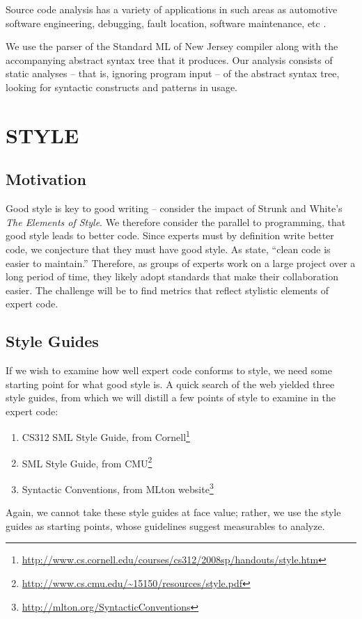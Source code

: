 \documentclass[12pt,abstracton]{scrartcl}
\begin{document}
Source code analysis has a variety of applications in such areas as
automotive software engineering, debugging, fault location, software maintenance,
etc \cite{Bin07}.

We use the parser of the Standard ML of New Jersey compiler along with the accompanying
abstract syntax tree that it produces. Our analysis
consists of static analyses -- that is, ignoring program input -- of the abstract syntax tree, looking for
syntactic constructs and patterns in usage.
\section{STYLE}\label{sec:style}
\subsection{Motivation}\label{subsec:style}
Good style is key to good writing -- consider the impact
of Strunk and White's \emph{The Elements of Style}.
We therefore consider the parallel to programming, that
good style leads to better code. Since experts must by
definition write better code, we conjecture that they
must have good style.
As \cite{Ker78} state, ``clean code is easier to maintain.''
Therefore, as groups of experts work on a large project over
a long period of time, they likely adopt standards that
make their collaboration easier.
The challenge will be to find metrics that reflect stylistic elements of expert code.
\subsection{Style Guides}\label{subsec:guide}
If we wish to examine how well expert code conforms to style, we need some starting point for
what good style is. A quick search of the web yielded three style guides, from which
we will distill a few points of style to examine in the expert code:
\begin{enumerate}
\item CS312 SML Style Guide, from Cornell\footnote{\url{http://www.cs.cornell.edu/courses/cs312/2008sp/handouts/style.htm}}
\item SML Style Guide, from CMU\footnote{\url{http://www.cs.cmu.edu/~15150/resources/style.pdf}}
\item Syntactic Conventions, from MLton website\footnote{\url{http://mlton.org/SyntacticConventions}}
\end{enumerate}

Again, we cannot take these style guides at face value; rather, we use
the style guides as starting points, whose guidelines suggest measurables
to analyze.
\end{document}

